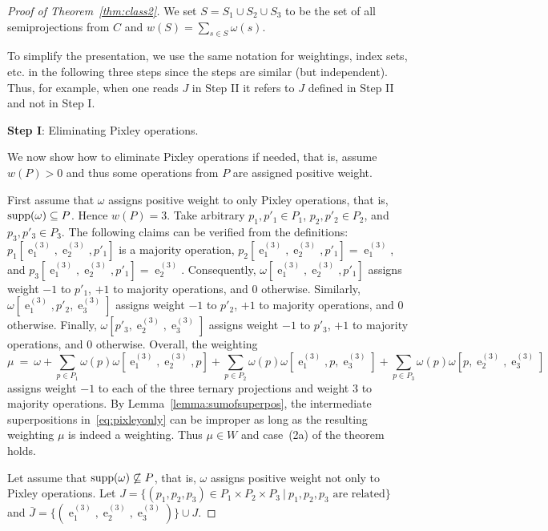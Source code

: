 \documentclass[11pt, reqno]{article}
\DeclareMathOperator{\proj}{\ensuremath{e}}
\DeclareMathOperator{\supp}{{\rm supp}}
\theoremstyle{remark}
\begin{document}
\begin{proof}[Proof of Theorem~\ref{thm:class2}]
  We set $S=S_1\cup S_2\cup S_3$ to be the set of all semiprojections from $C$
  and $w(S)=\sum_{s\in S}\omega(s)$. 


  To simplify the presentation, we use the same notation for weightings, 
  index sets, etc. in the following three steps since the steps are similar (but
  independent). Thus, for example, when one reads $J$ in Step II it refers
  to $J$ defined in Step II and not in Step I.

  \textbf{Step I}: Eliminating Pixley operations.

  We now show how to eliminate Pixley operations if needed, that is,
  assume $w(P)>0$ and thus some operations from $P$ are assigned positive
  weight.

  First assume that $\omega$ assigns positive weight to only Pixley operations,
  that is, $\supp(\omega)\subseteq P$. Hence $w(P)=3$. 
  Take arbitrary $p_1,p'_1\in P_1$, $p_2,p'_2\in P_2$, and $p_3,p'_3\in P_3$.
  The following claims can be verified from the definitions:
  $p_1[\proj^{(3)}_1,\proj^{(3)}_2,p'_1]$ is a majority operation,
  $p_2[\proj^{(3)}_1,\proj^{(3)}_2,p'_1]=\proj^{(3)}_1$, and
  $p_3[\proj^{(3)}_1,\proj^{(3)}_2,p'_1]=\proj^{(3)}_2$.  Consequently,
  $\omega[\proj^{(3)}_1,\proj^{(3)}_2,p'_1]$ assigns weight $-1$ to $p'_1$, $+1$
  to majority operations, and $0$ otherwise. Similarly,
  $\omega[\proj^{(3)}_1,p'_2,\proj^{(3)}_3]$ assigns weight $-1$ to $p'_2$, $+1$
  to majority operations, and $0$ otherwise. Finally, 
  $\omega[p'_3,\proj^{(3)}_2,\proj^{(3)}_3]$ assigns weight $-1$ to $p'_3$, $+1$
  to majority operations, and $0$ otherwise. Overall, the weighting
  \begin{equation}\label{eq:pixleyonly}
  \mu\ =\ \omega+\sum_{p\in P_1}\omega(p)\omega[\proj^{(3)}_1,\proj^{(3)}_2,p]
  +\sum_{p\in P_2}\omega(p)\omega[\proj^{(3)}_1,p,\proj^{(3)}_3]
  +\sum_{p\in P_3}\omega(p)\omega[p,\proj^{(3)}_2,\proj^{(3)}_3]
  \end{equation}
  assigns weight $-1$ to each of the three ternary projections and weight $3$ to
  majority operations. By Lemma~\ref{lemma:sumofsuperpos}, the intermediate
  superpositions in~\eqref{eq:pixleyonly} can be improper as long as the
  resulting weighting $\mu$ is indeed a weighting. Thus $\mu\in W$ and case~(2a)
  of the theorem holds.

  Let assume that $\supp(\omega)\not\subseteq P$, that is, $\omega$ assigns positive weight not only to Pixley
  operations.
  Let $J=\{(p_1,p_2,p_3)\in P_1\times P_2\times P_3\:|\:\mbox{$p_1, p_2, p_3$ are related}\}$
  and $\bar{J}=\{(\proj^{(3)}_1,\proj^{(3)}_2,\proj^{(3)}_3)\}\cup J$.


\end{proof}
\end{document}
